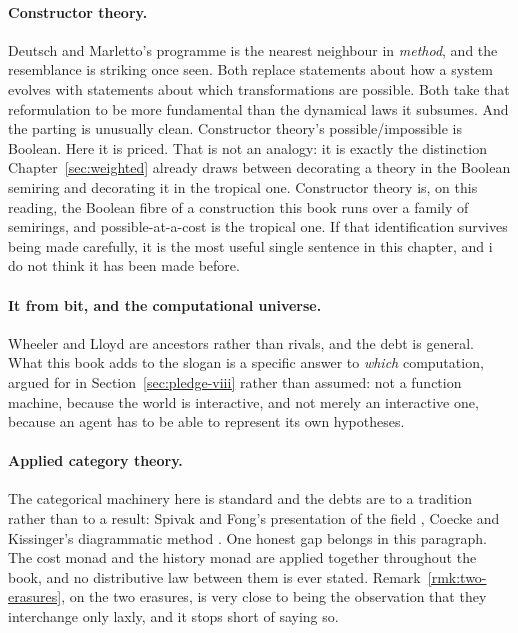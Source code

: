 \paragraph{Constructor theory.}
Deutsch and Marletto's programme \cite{deutsch2013,marletto2015}
is the nearest neighbour in \emph{method}, and the resemblance is
striking once seen.
Both replace statements about how a system evolves with statements
about which transformations are possible.
Both take that reformulation to be more fundamental than the
dynamical laws it subsumes.
And the parting is unusually clean.
Constructor theory's possible/impossible is Boolean.
Here it is priced.
That is not an analogy: it is exactly the distinction
Chapter~\ref{sec:weighted} already draws between decorating a
theory in the Boolean semiring and decorating it in the tropical
one.
Constructor theory is, on this reading, the Boolean fibre of a
construction this book runs over a family of semirings, and
possible-at-a-cost is the tropical one.
If that identification survives being made carefully, it is the
most useful single sentence in this chapter, and i do not think it
has been made before.

\paragraph{It from bit, and the computational universe.}
Wheeler \cite{wheeler1990} and Lloyd \cite{lloyd2006} are
ancestors rather than rivals, and the debt is general.
What this book adds to the slogan is a specific answer to
\emph{which} computation, argued for in
Section~\ref{sec:pledge-viii} rather than assumed: not a function
machine, because the world is interactive, and not merely an
interactive one, because an agent has to be able to represent its
own hypotheses.

\paragraph{Applied category theory.}
The categorical machinery here is standard and the debts are to a
tradition rather than to a result: Spivak and Fong's presentation
of the field \cite{fongspivak2019}, Coecke and Kissinger's
diagrammatic method \cite{coeckekissinger2017}.
One honest gap belongs in this paragraph.
The cost monad and the history monad are applied together
throughout the book, and no distributive law between them is ever
stated.
Remark~\ref{rmk:two-erasures}, on the two erasures, is very close to
being the observation that they interchange only laxly, and it
stops short of saying so.

